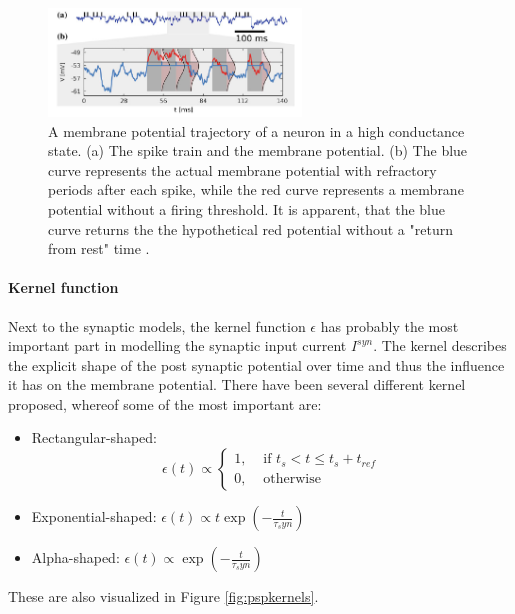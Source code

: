 \begin{figure}
	\centering
    	\includegraphics[width=0.6\textwidth]{imgs/hcs.png} 
    \caption{A membrane potential trajectory of a neuron in a high conductance state. (a) The spike train and the membrane potential. (b) The blue curve represents the actual membrane potential with refractory periods after each spike, while the red curve represents a membrane potential without a firing threshold. It is apparent, that the blue curve returns the the hypothetical red potential without a "return from rest" time  \cite{Petrovici2016}. }
	\label{fig:hcs}
\end{figure}


\paragraph{Kernel function}

Next to the synaptic models, the kernel function $\epsilon$ has probably the most important part in modelling the synaptic input current $I^{syn}$. 
The kernel describes the explicit shape of the post synaptic potential over time and thus the influence it has on the membrane potential.
There have been several different kernel proposed, whereof some of the most important are:
\begin{itemize}
\item Rectangular-shaped: \[\epsilon(t) \propto  \begin{cases} 1, & \text{ if } t_{s} < t \le t_{s} + t_{ref} \\ 0, & \text{ otherwise } \end{cases} \]
\item Exponential-shaped: $\epsilon(t) \propto t \exp(- \frac{t}{\tau_syn})$
\item Alpha-shaped: $\epsilon(t) \propto \exp(- \frac{t}{\tau_syn})$
\end{itemize}

These are also visualized in Figure \ref{fig:pspkernels}.

